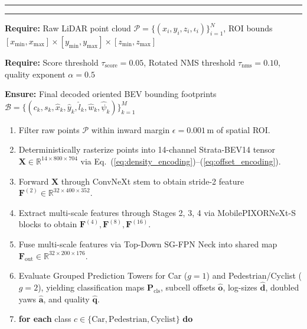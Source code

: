 \noindent
\rule{\linewidth}{0.6pt}\par\vspace{1pt}
\begingroup
\setlength{\tabcapgap}{0pt}
\label{alg:inference_pipeline}
\endgroup
\par\noindent\rule{\linewidth}{1pt}\par
{\small
\noindent\textbf{Require:} Raw LiDAR point cloud $\mathcal{P} = \{(x_i, y_i, z_i, \iota_i)\}_{i=1}^N$, ROI bounds $[x_{\min}, x_{\max}] \times [y_{\min}, y_{\max}] \times [z_{\min}, z_{\max}]$\par
\noindent\textbf{Require:} Score threshold $\tau_{\mathrm{score}} = 0.05$, Rotated NMS threshold $\tau_{\mathrm{nms}} = 0.10$, quality exponent $\alpha = 0.5$\par
\noindent\textbf{Ensure:} Final decoded oriented BEV bounding footprints $\mathcal{B} = \{(c_k, s_k, \hat{x}_k, \hat{y}_k, \hat{l}_k, \hat{w}_k, \hat{\psi}_k)\}_{k=1}^M$\par
\begin{enumerate}
    \setlength{\topsep}{2pt}
    \setlength{\itemsep}{0pt}
    \setlength{\parsep}{0pt}
    \renewcommand{\labelenumi}{\textbf{\arabic{enumi}:}}
    \item Filter raw points $\mathcal{P}$ within inward margin $\epsilon = 0.001$\,m of spatial ROI.
    \item Deterministically rasterize points into 14-channel Strata-BEV14 tensor $\mathbf{X} \in \mathbb{R}^{14 \times 800 \times 704}$ via Eq.~(\ref{eq:density_encoding})--(\ref{eq:offset_encoding}).
    \item Forward $\mathbf{X}$ through ConvNeXt stem to obtain stride-2 feature $\mathbf{F}^{(2)} \in \mathbb{R}^{32 \times 400 \times 352}$.
    \item Extract multi-scale features through Stages 2, 3, 4 via MobilePIXORNeXt-S blocks to obtain $\mathbf{F}^{(4)}, \mathbf{F}^{(8)}, \mathbf{F}^{(16)}$.
    \item Fuse multi-scale features via Top-Down SG-FPN Neck into shared map $\mathbf{F}_{\mathrm{out}} \in \mathbb{R}^{32 \times 200 \times 176}$.
    \item Evaluate Grouped Prediction Towers for Car ($g=1$) and Pedestrian/Cyclist ($g=2$), yielding classification maps $\mathbf{P}_{\mathrm{cls}}$, subcell offsets $\widehat{\mathbf{o}}$, log-sizes $\widehat{\mathbf{d}}$, doubled yaws $\widehat{\mathbf{a}}$, and quality $\widehat{\mathbf{q}}$.
    \item \textbf{for each} class $c \in \{\text{Car}, \text{Pedestrian}, \text{Cyclist}\}$ \textbf{do}

\end{enumerate}}
